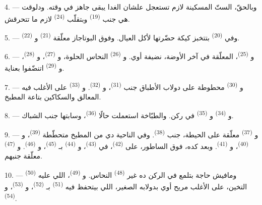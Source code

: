 4. --- وبالحقّ، الستّ المسكينة لازم تستعجل علشان الغدا يبقى جاهز في وقته.
ودلوقت هي جنب  \textsuperscript{(19)} وبتقلّب 
\textsuperscript{(24)} لازم ما تتحرقش.

5. --- وفي  \textsuperscript{(20)} بتتخبز كيكة حضّرتها لأكل العيال.
وفوق البوتاجاز معلّقة  \textsuperscript{(21)} و
\textsuperscript{(22)}.

\VUsaut{4.0mm}
\VUsaut{3.0mm}

6. --- و \textsuperscript{(25)}، المعلّقة في آخر الأوضة، نضيفة أوي.
و \textsuperscript{(26)} النحاس الحلوة، و
\textsuperscript{(27)}، و \textsuperscript{(28)}،
و \textsuperscript{(29)} اتنضّفوا بعناية.

7. --- و \textsuperscript{(30)} محطوطة على دولاب الأطباق جنب
 \textsuperscript{(31)}، و \textsuperscript{(32)}.
و \textsuperscript{(33)} على الأغلب فيه المعالق والسكاكين بتاعة المطبخ.

8. --- و \textsuperscript{(34)} و \textsuperscript{(35)} في
ركن. والطبّاخة استعملت حالًا  \textsuperscript{(36)}، وسابتها جنب الشباك.

9. --- و \textsuperscript{(37)} معلّقة على الحيطة، جنب
 \textsuperscript{(38)}. وفي الناحية دي من المطبخ متحطّطة
 \textsuperscript{(39)}، و \textsuperscript{(40)}،
و \textsuperscript{(41)}. وبعد كده، فوق الساطور، على 
\textsuperscript{(42)}، في  \textsuperscript{(43)}، و
\textsuperscript{(44)} بـ \textsuperscript{(45)}، و
\textsuperscript{(46)}. و \textsuperscript{(47)} معلّقة جنبهم.

10. --- ومافيش حاجة بتلمع في الركن ده غير  \textsuperscript{(48)}
النحاس. و \textsuperscript{(49)}، اللي عليه 
\textsuperscript{(50)} التخين، على الأغلب مريح أوي بدولابه الصغير، اللي بيتحفظ فيه
 \textsuperscript{(51)} بـ \textsuperscript{(52)}،
و \textsuperscript{(53)}، و
\textsuperscript{(54)}.

